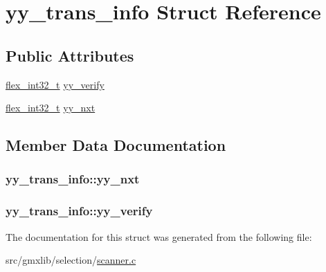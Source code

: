 \hypertarget{structyy__trans__info}{\section{yy\-\_\-trans\-\_\-info \-Struct \-Reference}
\label{structyy__trans__info}
}
\subsection*{\-Public \-Attributes}
\begin{DoxyCompactItemize}
\item 
\hyperlink{scanner_8c_a838ce943cf44ef7769480714fc6c3ba9}{flex\-\_\-int32\-\_\-t} \hyperlink{structyy__trans__info_a5c9f61e770deef50bd4e697310342fe9}{yy\-\_\-verify}
\item 
\hyperlink{scanner_8c_a838ce943cf44ef7769480714fc6c3ba9}{flex\-\_\-int32\-\_\-t} \hyperlink{structyy__trans__info_ae0715250c2bef261e596e77e0030f13e}{yy\-\_\-nxt}
\end{DoxyCompactItemize}


\subsection{\-Member \-Data \-Documentation}
\hypertarget{structyy__trans__info_ae0715250c2bef261e596e77e0030f13e}{
\subsubsection[{yy\-\_\-nxt}]{ {\bf yy\-\_\-trans\-\_\-info\-::yy\-\_\-nxt}}}\label{structyy__trans__info_ae0715250c2bef261e596e77e0030f13e}
\hypertarget{structyy__trans__info_a5c9f61e770deef50bd4e697310342fe9}{
\subsubsection[{yy\-\_\-verify}]{ {\bf yy\-\_\-trans\-\_\-info\-::yy\-\_\-verify}}}\label{structyy__trans__info_a5c9f61e770deef50bd4e697310342fe9}


\-The documentation for this struct was generated from the following file\-:\begin{DoxyCompactItemize}
\item 
src/gmxlib/selection/\hyperlink{scanner_8c}{scanner.\-c}\end{DoxyCompactItemize}
